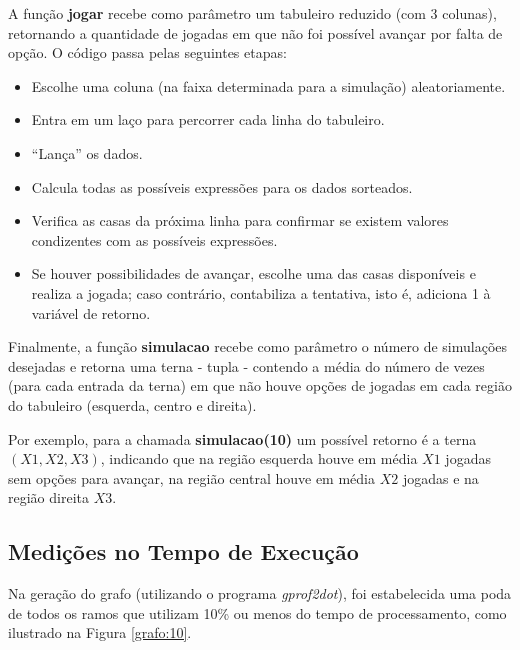 \documentclass[12pt]{article}
\newcommand{\aspas}[1]{``#1''} %
\begin{document}
A função \textbf{jogar} recebe como parâmetro um tabuleiro reduzido (com 3 colunas), retornando a quantidade de jogadas
em que não foi possível avançar por falta de opção. O código passa pelas seguintes etapas:

\begin{itemize}
	\item Escolhe uma coluna (na faixa determinada para a simulação) aleatoriamente.
	\item Entra em um laço para percorrer cada linha do tabuleiro.
	\item \aspas{Lança} os dados.
	\item Calcula todas as possíveis expressões para os dados sorteados.
	\item Verifica as casas da próxima linha para confirmar se existem valores condizentes com as possíveis expressões.
	\item Se houver possibilidades de avançar, escolhe uma das casas disponíveis e realiza a jogada; caso contrário, contabiliza a tentativa, isto é, adiciona 1 à variável de retorno.
\end{itemize}

Finalmente, a função \textbf{simulacao} recebe como parâmetro o número de simulações desejadas e retorna uma terna - tupla - contendo a média do número de vezes (para cada entrada da terna) em que não houve opções de jogadas em cada região do tabuleiro (esquerda, centro e direita). 

Por exemplo, para a chamada \textbf{simulacao(10)} um possível retorno é a terna $(X1, X2, X3)$, indicando que na região esquerda houve em média $X1$ jogadas sem opções para avançar, na região central houve em média $X2$ jogadas e na região direita $X3$.

\subsection{Medições no Tempo de Execução}
\label{medicoes}

Na geração do grafo (utilizando o programa \textit{gprof2dot}), foi estabelecida uma poda de todos os ramos que utilizam 10\% ou menos do tempo de processamento, como ilustrado na Figura \ref{grafo:10}.
\end{document}

